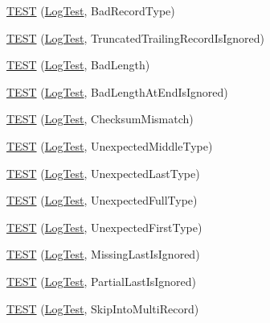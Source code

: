 \begin{DoxyCompactItemize}
\item 
\mbox{\hyperlink{namespaceleveldb_1_1log_a4fd335e6dbc3a27ea10e985387f69d6d}{T\+E\+ST}} (\mbox{\hyperlink{classleveldb_1_1log_1_1_log_test}{Log\+Test}}, Bad\+Record\+Type)
\item 
\mbox{\hyperlink{namespaceleveldb_1_1log_aa1e3f8be0b7799bfb21c5c4bf40d22c3}{T\+E\+ST}} (\mbox{\hyperlink{classleveldb_1_1log_1_1_log_test}{Log\+Test}}, Truncated\+Trailing\+Record\+Is\+Ignored)
\item 
\mbox{\hyperlink{namespaceleveldb_1_1log_a024a8bc0f558ffe46b3a15ab43018402}{T\+E\+ST}} (\mbox{\hyperlink{classleveldb_1_1log_1_1_log_test}{Log\+Test}}, Bad\+Length)
\item 
\mbox{\hyperlink{namespaceleveldb_1_1log_a22b6e6d2a3de82f3e05d63e13f44b9fd}{T\+E\+ST}} (\mbox{\hyperlink{classleveldb_1_1log_1_1_log_test}{Log\+Test}}, Bad\+Length\+At\+End\+Is\+Ignored)
\item 
\mbox{\hyperlink{namespaceleveldb_1_1log_a2dccd9d88a61eb0f59fdea07edfe2022}{T\+E\+ST}} (\mbox{\hyperlink{classleveldb_1_1log_1_1_log_test}{Log\+Test}}, Checksum\+Mismatch)
\item 
\mbox{\hyperlink{namespaceleveldb_1_1log_ae2aa67608715051976e4cbb2008e3b52}{T\+E\+ST}} (\mbox{\hyperlink{classleveldb_1_1log_1_1_log_test}{Log\+Test}}, Unexpected\+Middle\+Type)
\item 
\mbox{\hyperlink{namespaceleveldb_1_1log_ad618b3ff1dc35a8641c019d8eb4a4e8b}{T\+E\+ST}} (\mbox{\hyperlink{classleveldb_1_1log_1_1_log_test}{Log\+Test}}, Unexpected\+Last\+Type)
\item 
\mbox{\hyperlink{namespaceleveldb_1_1log_a178460e2ee7a665f0aef08a28217a6d3}{T\+E\+ST}} (\mbox{\hyperlink{classleveldb_1_1log_1_1_log_test}{Log\+Test}}, Unexpected\+Full\+Type)
\item 
\mbox{\hyperlink{namespaceleveldb_1_1log_a7c8a46287bbb1e185ccfcb78c5ae94e3}{T\+E\+ST}} (\mbox{\hyperlink{classleveldb_1_1log_1_1_log_test}{Log\+Test}}, Unexpected\+First\+Type)
\item 
\mbox{\hyperlink{namespaceleveldb_1_1log_a965e5192bb2f0467f987fe54995d0c89}{T\+E\+ST}} (\mbox{\hyperlink{classleveldb_1_1log_1_1_log_test}{Log\+Test}}, Missing\+Last\+Is\+Ignored)
\item 
\mbox{\hyperlink{namespaceleveldb_1_1log_acae9dd4e93ded56d6585082822964b71}{T\+E\+ST}} (\mbox{\hyperlink{classleveldb_1_1log_1_1_log_test}{Log\+Test}}, Partial\+Last\+Is\+Ignored)
\item 
\mbox{\hyperlink{namespaceleveldb_1_1log_af81444ef2ffe0f52c3fb766a5c5db3ea}{T\+E\+ST}} (\mbox{\hyperlink{classleveldb_1_1log_1_1_log_test}{Log\+Test}}, Skip\+Into\+Multi\+Record)

\end{DoxyCompactItemize}
